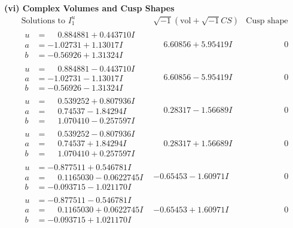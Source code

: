 \documentclass[1p]{elsarticle_modified}
\theoremstyle{definition}
\newcommand{\I}{\sqrt{-1}}
\begin{document}
\newpage\flushleft \textbf{(vi) Complex Volumes and Cusp Shapes}
$$\begin{array}{c|c|c}  
\text{Solutions to }I^u_{1}& \I (\text{vol} + \sqrt{-1}CS) & \text{Cusp shape}\\
 \hline 
\begin{aligned}
u &= \phantom{-}0.884881 + 0.443710 I \\
a &= -1.02731 + 1.13017 I \\
b &= -0.56926 + 1.31324 I\end{aligned}
 & \phantom{-}6.60856 + 5.95419 I & \phantom{-0.000000 } 0 \\ \hline\begin{aligned}
u &= \phantom{-}0.884881 - 0.443710 I \\
a &= -1.02731 - 1.13017 I \\
b &= -0.56926 - 1.31324 I\end{aligned}
 & \phantom{-}6.60856 - 5.95419 I & \phantom{-0.000000 } 0 \\ \hline\begin{aligned}
u &= \phantom{-}0.539252 + 0.807936 I \\
a &= \phantom{-}0.74537 - 1.84294 I \\
b &= \phantom{-}1.070410 - 0.257597 I\end{aligned}
 & \phantom{-}0.28317 - 1.56689 I & \phantom{-0.000000 } 0 \\ \hline\begin{aligned}
u &= \phantom{-}0.539252 - 0.807936 I \\
a &= \phantom{-}0.74537 + 1.84294 I \\
b &= \phantom{-}1.070410 + 0.257597 I\end{aligned}
 & \phantom{-}0.28317 + 1.56689 I & \phantom{-0.000000 } 0 \\ \hline\begin{aligned}
u &= -0.877511 + 0.546781 I \\
a &= \phantom{-}0.1165030 - 0.0622745 I \\
b &= -0.093715 - 1.021170 I\end{aligned}
 & -0.65453 - 1.60971 I & \phantom{-0.000000 } 0 \\ \hline\begin{aligned}
u &= -0.877511 - 0.546781 I \\
a &= \phantom{-}0.1165030 + 0.0622745 I \\
b &= -0.093715 + 1.021170 I\end{aligned}
 & -0.65453 + 1.60971 I & \phantom{-0.000000 } 0 \\ \hline\begin{aligned}

\end{aligned}
\end{array}$$
\end{document}

